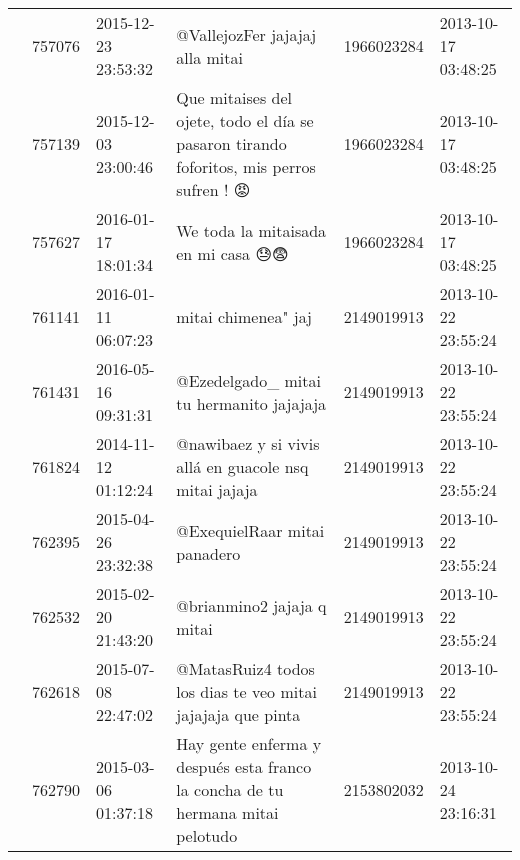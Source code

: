 \begin{tabular}{llllrl}
           & 757076  & 2015-12-23 23:53:32 &                                                                                                              @VallejozFer jajajaj alla mitai &  1966023284 & 2013-10-17 03:48:25 \\
           & 757139  & 2015-12-03 23:00:46 &                                                      Que mitaises del ojete, todo el día se pasaron tirando foforitos, mis perros sufren ! 😡 &  1966023284 & 2013-10-17 03:48:25 \\
           & 757627  & 2016-01-17 18:01:34 &                                                                                                           We toda la mitaisada en mi casa 😓😨 &  1966023284 & 2013-10-17 03:48:25 \\
           & 761141  & 2016-01-11 06:07:23 &                                                                                                                          mitai chimenea" jaj &  2149019913 & 2013-10-22 23:55:24 \\
           & 761431  & 2016-05-16 09:31:31 &                                                                                                     @Ezedelgado\_ mitai tu hermanito jajajaja &  2149019913 & 2013-10-22 23:55:24 \\
           & 761824  & 2014-11-12 01:12:24 &                                                                                        @nawibaez y si vivis allá en guacole nsq mitai jajaja &  2149019913 & 2013-10-22 23:55:24 \\
           & 762395  & 2015-04-26 23:32:38 &                                                                                                                 @ExequielRaar mitai panadero &  2149019913 & 2013-10-22 23:55:24 \\
           & 762532  & 2015-02-20 21:43:20 &                                                                                                                   @brianmino2 jajaja q mitai &  2149019913 & 2013-10-22 23:55:24 \\
           & 762618  & 2015-07-08 22:47:02 &                                                                                   @MatasRuiz4 todos los dias te veo mitai jajajaja que pinta &  2149019913 & 2013-10-22 23:55:24 \\
           & 762790  & 2015-03-06 01:37:18 &                                                               Hay gente enferma y después esta franco la concha de tu hermana mitai pelotudo &  2153802032 & 2013-10-24 23:16:31 \\

\end{tabular}
